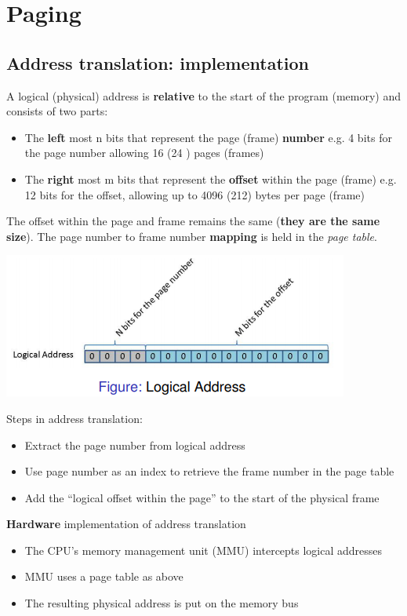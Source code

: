 \documentclass{article}
\begin{document}
\section{Paging}
\subsection{Address translation: implementation}
\begin{flushleft}
A logical (physical) address is \textbf{relative} to the start of the program (memory) and consists of two parts:
\begin{itemize}
	\item The \textbf{left} most n bits that represent the page (frame) \textbf{number} e.g. 4 bits for the page number allowing 16 (24 ) pages (frames)
	\item  The \textbf{right} most m bits that represent the \textbf{offset} within the page (frame) e.g. 12 bits for the offset, allowing up to 4096 (212) bytes per page (frame)
\end{itemize}
 The offset within the page and frame remains the same (\textbf{they are the same size}). The page number to frame number \textbf{mapping} is held in the \textit{page table}.
\begin{center}
	\includegraphics[scale=0.6]{logical_address.png}
\end{center}
\bigskip
Steps in address translation:
\begin{itemize}
	\item Extract the page number from logical address
	\item Use page number as an index to retrieve the frame number in the page table
	\item Add the “logical offset within the page” to the start of the physical frame
\end{itemize}
\textbf{Hardware} implementation of address translation
\begin{itemize}
	\item The CPU’s memory management unit (MMU) intercepts logical addresses
	\item MMU uses a page table as above
	\item The resulting physical address is put on the memory bus
\end{itemize}
\end{flushleft}
\end{document}
